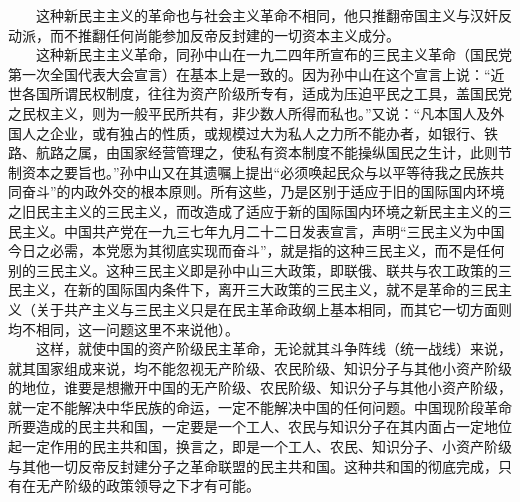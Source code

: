 \documentclass[cn,11pt,chinese]{elegantbook}
\begin{document}
　　这种新民主主义的革命也与社会主义革命不相同，他只推翻帝国主义与汉奸反动派，而不推翻任何尚能参加反帝反封建的一切资本主义成分。\\
　　这种新民主主义革命，同孙中山在一九二四年所宣布的三民主义革命（国民党第一次全国代表大会宣言）在基本上是一致的。因为孙中山在这个宣言上说：“近世各国所谓民权制度，往往为资产阶级所专有，适成为压迫平民之工具，盖国民党之民权主义，则为一般平民所共有，非少数人所得而私也。”又说：“凡本国人及外国人之企业，或有独占的性质，或规模过大为私人之力所不能办者，如银行、铁路、航路之属，由国家经营管理之，使私有资本制度不能操纵国民之生计，此则节制资本之要旨也。”孙中山又在其遗嘱上提出“必须唤起民众与以平等待我之民族共同奋斗”的内政外交的根本原则。所有这些，乃是区别于适应于旧的国际国内环境之旧民主主义的三民主义，而改造成了适应于新的国际国内环境之新民主主义的三民主义。中国共产党在一九三七年九月二十二日发表宣言，声明“三民主义为中国今日之必需，本党愿为其彻底实现而奋斗”，就是指的这种三民主义，而不是任何别的三民主义。这种三民主义即是孙中山三大政策，即联俄、联共与农工政策的三民主义，在新的国际国内条件下，离开三大政策的三民主义，就不是革命的三民主义（关于共产主义与三民主义只是在民主革命政纲上基本相同，而其它一切方面则均不相同，这一问题这里不来说他）。\\
　　这样，就使中国的资产阶级民主革命，无论就其斗争阵线（统一战线）来说，就其国家组成来说，均不能忽视无产阶级、农民阶级、知识分子与其他小资产阶级的地位，谁要是想撇开中国的无产阶级、农民阶级、知识分子与其他小资产阶级，就一定不能解决中华民族的命运，一定不能解决中国的任何问题。中国现阶段革命所要造成的民主共和国，一定要是一个工人、农民与知识分子在其内面占一定地位起一定作用的民主共和国，换言之，即是一个工人、农民、知识分子、小资产阶级与其他一切反帝反封建分子之革命联盟的民主共和国。这种共和国的彻底完成，只有在无产阶级的政策领导之下才有可能。\\
\end{document}

